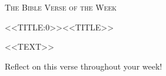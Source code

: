 \documentclass{article}
\begin{document}
\begin{center}
{\Huge \textsc{The Bible Verse of the Week}}
\end{center}

\vspace{1cm}

\begin{tcolorbox}[bibleversebox]
\lettrine[lines=3, loversize=0.3]{<<TITLE:0>>}{<<TITLE>>}

<<TEXT>>
\end{tcolorbox}

\vspace{1cm}

\begin{center}
{\large Reflect on this verse throughout your week!}
\end{center}
\end{document}
